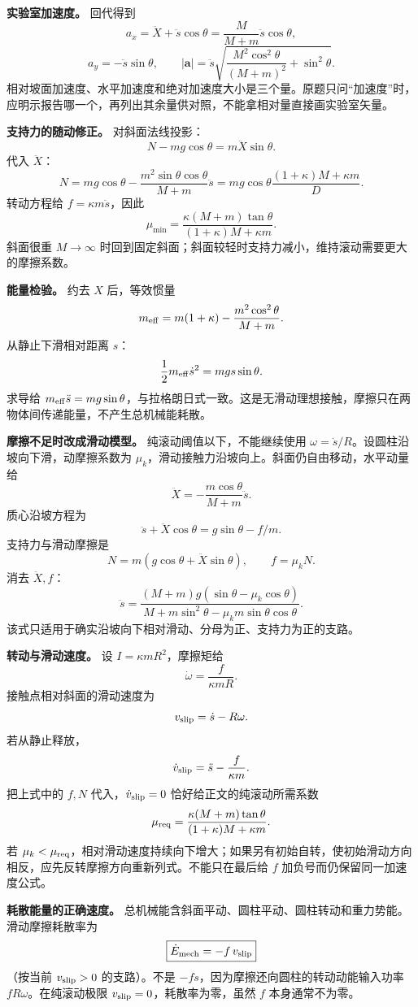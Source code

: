 \documentclass[12pt,a4paper,UTF8]{ctexart}
\begin{document}
\textbf{实验室加速度。} 回代得到 \[
a_x=\ddot X+\ddot s\cos\theta
=\frac{M}{M+m}\ddot s\cos\theta,
\] \[
a_y=-\ddot s\sin\theta,\qquad
|\boldsymbol a|=\ddot s
\sqrt{\frac{M^2\cos^2\theta}{(M+m)^2}+\sin^2\theta}.
\]
相对坡面加速度、水平加速度和绝对加速度大小是三个量。原题只问``加速度''时，应明示报告哪一个，再列出其余量供对照，不能拿相对量直接画实验室矢量。

\textbf{支持力的随动修正。} 对斜面法线投影： \[
N-mg\cos\theta=m\ddot X\sin\theta.
\] 代入 \(\ddot X\)： \[
N=mg\cos\theta-\frac{m^2\sin\theta\cos\theta}{M+m}\ddot s
=mg\cos\theta\frac{(1+\kappa)M+\kappa m}{D}.
\] 转动方程给 \(f=\kappa m\ddot s\)，因此 \[
\boxed{\mu_{\min}=
\frac{\kappa(M+m)\tan\theta}
{(1+\kappa)M+\kappa m}}.
\] 斜面很重 \(M\to\infty\)
时回到固定斜面；斜面较轻时支持力减小，维持滚动需要更大的摩擦系数。

\textbf{能量检验。} 约去 \(X\) 后，等效惯量 \[
m_{\rm eff}=m(1+\kappa)-\frac{m^2\cos^2\theta}{M+m}.
\] 从静止下滑相对距离 \(s\)： \[
\frac12m_{\rm eff}\dot s^2=mgs\sin\theta.
\] 求导给
\(m_{\rm eff}\ddot s=mg\sin\theta\)，与拉格朗日式一致。这是无滑动理想接触，摩擦只在两物体间传递能量，不产生总机械能耗散。

\textbf{摩擦不足时改成滑动模型。} 纯滚动阈值以下，不能继续使用
\(\omega=\dot s/R\)。设圆柱沿坡向下滑，动摩擦系数为
\(\mu_k\)，滑动接触力沿坡向上。斜面仍自由移动，水平动量给 \[
\ddot X=-\frac{m\cos\theta}{M+m}\ddot s.
\] 质心沿坡方程为 \[
\ddot s+\ddot X\cos\theta=g\sin\theta-f/m.
\] 支持力与滑动摩擦是 \[
N=m(g\cos\theta+\ddot X\sin\theta),\qquad f=\mu_kN.
\] 消去 \(\ddot X,f\)： \[
\boxed{\ddot s=
\frac{(M+m)g(\sin\theta-\mu_k\cos\theta)}
{M+m\sin^2\theta-\mu_km\sin\theta\cos\theta}}.
\] 该式只适用于确实沿坡向下相对滑动、分母为正、支持力为正的支路。

\textbf{转动与滑动速度。} 设 \(I=\kappa mR^2\)，摩擦矩给 \[
\dot\omega=\frac{f}{\kappa mR}.
\] 接触点相对斜面的滑动速度为 \[
v_{\rm slip}=\dot s-R\omega.
\] 若从静止释放， \[
\dot v_{\rm slip}=\ddot s-\frac{f}{\kappa m}.
\] 把上式中的 \(f,N\) 代入，\(\dot v_{\rm slip}=0\)
恰好给正文的纯滚动所需系数 \[
\mu_{\rm req}=
\frac{\kappa(M+m)\tan\theta}
{(1+\kappa)M+\kappa m}.
\] 若
\(\mu_k<\mu_{\rm req}\)，相对滑动速度持续向下增大；如果另有初始自转，使初始滑动方向相反，应先反转摩擦方向重新列式。不能只在最后给
\(f\) 加负号而仍保留同一加速度公式。

\textbf{耗散能量的正确速度。}
总机械能含斜面平动、圆柱平动、圆柱转动和重力势能。滑动摩擦耗散率为 \[
\boxed{\dot E_{\rm mech}=-f\,v_{\rm slip}}
\] （按当前 \(v_{\rm slip}>0\) 的支路）。不是
\(-f\dot s\)，因为摩擦还向圆柱的转动动能输入功率
\(fR\omega\)。在纯滚动极限 \(v_{\rm slip}=0\)，耗散率为零，虽然 \(f\)
本身通常不为零。
\end{document}

